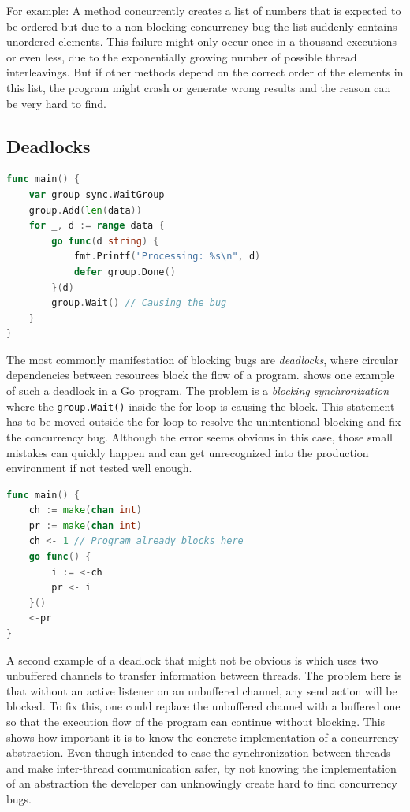 \documentclass[conference]{IEEEtran}
\begin{document}
For example: A method concurrently creates a list of numbers that is expected to be ordered but due to a non-blocking concurrency bug the list suddenly contains unordered elements.
This failure might only occur once in a thousand executions or even less, due to the exponentially growing number of possible thread interleavings.
But if other methods depend on the correct order of the elements in this list, the program might crash or generate wrong results and the reason can be very hard to find.

\subsection{Deadlocks}
\begin{lstlisting}[float=h, language=Go, label=lst:deadlockWG, caption=Deadlock caused by waiting for the \emph{WaitGroup} at a wrong location -- based on \cite{tu2019go}]
func main() {
    var group sync.WaitGroup
    group.Add(len(data))
    for _, d := range data {
        go func(d string) {
            fmt.Printf("Processing: %s\n", d)
            defer group.Done()
        }(d)
        group.Wait() // Causing the bug
    }
}
\end{lstlisting}

The most commonly manifestation of blocking bugs are \emph{deadlocks}, where circular dependencies between resources block the flow of a program.
 shows one example of such a deadlock in a Go program.
The problem is a \emph{blocking synchronization} where the \lstinline{group.Wait()} inside the for-loop is causing the block.
This statement has to be moved outside the for loop to resolve the unintentional blocking and fix the concurrency bug.
Although the error seems obvious in this case, those small mistakes can quickly happen and can get unrecognized into the production environment if not tested well enough.

\begin{lstlisting}[float=h, language=Go, label=lst:deadlockCh, caption={Deadlock caused by misuse of an \emph{unbuffered Channel}}]
func main() {
    ch := make(chan int)
    pr := make(chan int)
    ch <- 1 // Program already blocks here
    go func() {
        i := <-ch
        pr <- i
    }()
    <-pr
}
\end{lstlisting}

A second example of a deadlock that might not be obvious is  which uses two unbuffered channels to transfer information between threads.
The problem here is that without an active listener on an unbuffered channel, any send action will be blocked.
To fix this, one could replace the unbuffered channel with a buffered one so that the execution flow of the program can continue without blocking.
This shows how important it is to know the concrete implementation of a concurrency abstraction.
Even though intended to ease the synchronization between threads and make inter-thread communication safer, by not knowing the implementation of an abstraction the developer can unknowingly create hard to find concurrency bugs.
\end{document}
